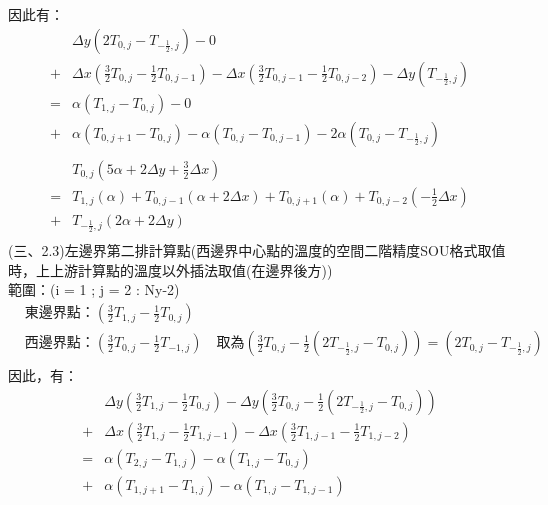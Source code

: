 \documentclass[12pt]{article}
\begin{document}
\noindent   因此有：
\begin{equation}
  \begin{split}
    &\Delta y (2T_{0,j} - T_{-\frac{1}{2},j}) - 0 \\
     + &\Delta x(\frac{3}{2}T_{0,j} - \frac{1}{2}T_{0,j-1} ) - \Delta x(\frac{3}{2}T_{0,j-1} - \frac{1}{2}T_{0,j-2} ) - \Delta y(T_{-\frac{1}{2},j}) \\
     = &\alpha (T_{1,j}-T_{0,j}) - 0 \\
     + &\alpha (T_{0,j+1}-T_{0,j}) - \alpha(T_{0,j}-T_{0,j-1}) - 2\alpha (T_{0,j} - T_{-\frac{1}{2},j}) \\
  \end{split} 
\end{equation}
\begin{equation}
\begin{split}
      &T_{0,j}(5\alpha+2\Delta y + \frac{3}{2}\Delta x)\\
    = &T_{1,j}(\alpha)+T_{0,j-1}(\alpha+2\Delta x)+T_{0,j+1}(\alpha)+T_{0,j-2}(-\frac{1}{2}\Delta x)\\
    + &T_{-\frac{1}{2},j}(2\alpha+2\Delta y )\\
\end{split}
\end{equation}
\noindent (三、2.3)左邊界第二排計算點(西邊界中心點的溫度的空間二階精度SOU格式取值時，上上游計算點的溫度以外插法取值(在邊界後方))\\
\noindent 範圍：(i = 1 ; j = 2 : Ny-2)\\
\begin{equation}
  \begin{split}
    &\mbox{東邊界點：}(\frac{3}{2}T_{1,j} - \frac{1}{2}T_{0,j} )\\ 
    &\mbox{西邊界點：}(\frac{3}{2}T_{0,j} - \frac{1}{2}T_{-1,j} )\quad \mbox{取為}(\frac{3}{2}T_{0,j} - \frac{1}{2}(2T_{-\frac{1}{2},j}-T_{0,j})) = (2T_{0,j} - T_{-\frac{1}{2},j}) \\  \end{split}
\end{equation}
\noindent 因此，有：
\begin{equation}
  \begin{split}
    &\Delta y (\frac{3}{2}T_{1,j} - \frac{1}{2}T_{0,j}) - \Delta y (\frac{3}{2}T_{0,j} - \frac{1}{2}(2T_{-\frac{1}{2},j}-T_{0,j}))  \\
     + &\Delta x(\frac{3}{2}T_{1,j} - \frac{1}{2}T_{1,j-1} ) - \Delta x(\frac{3}{2}T_{1,j-1} - \frac{1}{2}T_{1,j-2} )  \\
     = &\alpha (T_{2,j}-T_{1,j}) -\alpha (T_{1,j}-T_{0,j})  \\
     + &\alpha (T_{1,j+1}-T_{1,j}) - \alpha(T_{1,j}-T_{1,j-1}) \\
  \end{split} 
\end{equation}
\end{document}
